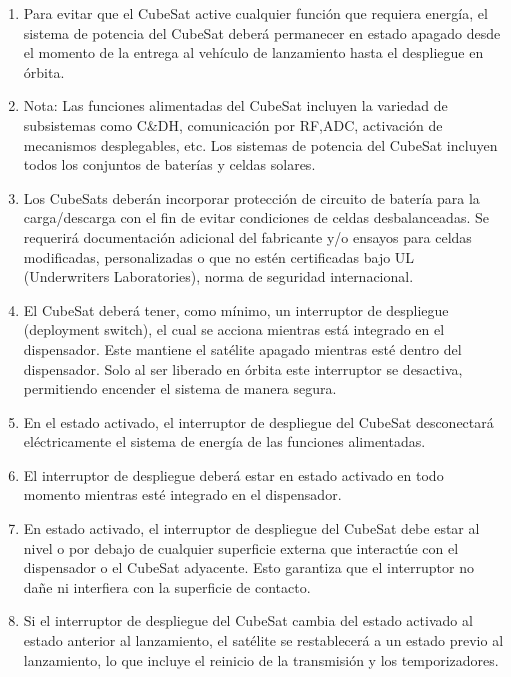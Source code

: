 \documentclass[11pt,a4paper,twoside]{report}
\begin{document}
	\begin{enumerate}
		\item Para evitar que el CubeSat active cualquier función que requiera energía, el sistema de potencia del CubeSat deberá permanecer en estado apagado desde el momento de la entrega al vehículo de lanzamiento hasta el despliegue en órbita.
		
		\item Nota: Las funciones alimentadas del CubeSat incluyen la variedad de subsistemas como C\&DH, comunicación por RF,ADC, activación de mecanismos desplegables, etc. Los sistemas de potencia del CubeSat incluyen todos los conjuntos de baterías y celdas solares.
		
		\item Los CubeSats deberán incorporar protección de circuito de batería para la carga/descarga con el fin de evitar condiciones de celdas desbalanceadas. Se requerirá documentación adicional del fabricante y/o ensayos para celdas modificadas, personalizadas o que no estén certificadas bajo UL (Underwriters Laboratories), norma de seguridad internacional.
		
		\item El CubeSat deberá tener, como mínimo, un interruptor de despliegue (deployment switch), el cual se acciona mientras está integrado en el dispensador. Este mantiene el satélite apagado mientras esté dentro del dispensador. Solo al ser liberado en órbita este interruptor se desactiva, permitiendo encender el sistema de manera segura.
		
		\item En el estado activado, el interruptor de despliegue del CubeSat desconectará eléctricamente el sistema de energía de las funciones alimentadas.
		
		\item El interruptor de despliegue deberá estar en estado activado en todo momento mientras esté integrado en el dispensador.
		
		\item En estado activado, el interruptor de despliegue del CubeSat debe estar al nivel o por debajo de cualquier superficie externa que interactúe con el dispensador o el CubeSat adyacente. Esto garantiza que el interruptor no dañe ni interfiera con la superficie de contacto.
		
		\item Si el interruptor de despliegue del CubeSat cambia del estado activado al estado anterior al lanzamiento, el satélite se restablecerá a un estado previo al lanzamiento, lo que incluye el reinicio de la transmisión y los temporizadores.
		

\end{enumerate}
\end{document}
